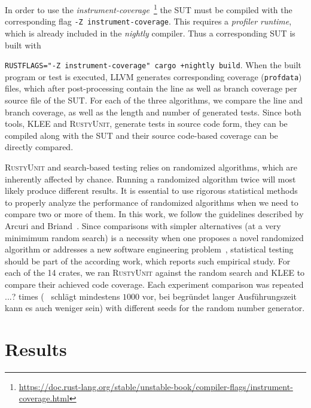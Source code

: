 \documentclass[paper=a4,%
  twoside,%
  BCOR4mm,%
  abstract=true,%
  toc=bibliography,%
  chapterprefix=true,%
  toc=bibliographynumbered,%
  open=right,%
  english,%
  pagesize=pdftex]{scrreprt}
\begin{document}
In order to use the \textit{instrument-coverage}~\footnote{\url{https://doc.rust-lang.org/stable/unstable-book/compiler-flags/instrument-coverage.html}} the SUT must be compiled with the corresponding flag \lstinline{-Z instrument-coverage}. This requires a \textit{profiler runtime}, which is already included in the \textit{nightly} compiler. Thus a corresponding SUT is built with \raggedright\lstinline{RUSTFLAGS="-Z instrument-coverage" cargo +nightly build}. When the built program or test is executed, LLVM generates corresponding coverage (\lstinline{profdata}) files, which after post-processing contain the line as well as branch coverage per source file of the \ac{SUT}. For each of the three algorithms, we compare the line and branch coverage, as well as the length and number of generated tests. Since both tools, \textsc{KLEE} and \textsc{RustyUnit}, generate tests in source code form, they can be compiled along with the \ac{SUT} and their source code-based coverage can be directly compared.

\textsc{RustyUnit} and search-based testing relies on randomized algorithms, which are inherently affected by chance. Running a randomized algorithm twice will most likely produce different results. It is essential to use rigorous statistical methods to properly analyze the performance of randomized algorithms when we need to compare two or more of them. In this work, we follow the guidelines described by Arcuri and Briand~\cite{Arcuri2011}. Since comparisons with simpler alternatives (at a very minimimum random search) is a necessity when one proposes a novel randomized algorithm or addresses a new software engineering problem~\cite{Ali2010}, statistical testing should be part of the according work, which reports such empirical study. For each of the 14 crates, we ran \textsc{RustyUnit} against the random search and \textsc{KLEE} to compare their achieved code coverage. Each experiment comparison was repeated ...? times (~\cite{Arcuri2011} schlägt mindestens $1000$ vor, bei begründet langer Ausführungszeit kann es auch weniger sein) with different seeds for the random number generator.

\section{Results}
\label{sec:results}
\end{document}
